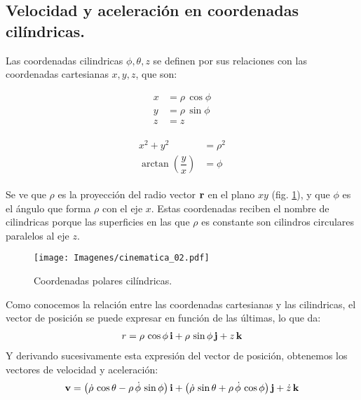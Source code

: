 \documentclass[12pt]{article}
\begin{document}
\subsection{Velocidad y aceleración en coordenadas cilíndricas.}

Las coordenadas cilindricas $\phi, \theta, z$ se definen por sus relaciones con las coordenadas cartesianas $x, y, z$, que son:

\vspace*{-1cm}
\begin{center}
\begin{minipage}[t]{0.3\linewidth}
\begin{align*}
x &= \rho \, \cos \phi \\
y &= \rho \, \sin \phi \\
z &= z
\end{align*}
\end{minipage}
\begin{minipage}[t]{0.3\linewidth}
\begin{align}
\begin{aligned}
x^{2} + y^{2} &= \rho^{2} \\
\arctan \left( \dfrac{y}{x} \right) &= \phi
\end{aligned}
\label{eq:ecuacion_02_10}
\end{align}
\end{minipage}
\end{center}
Se ve que $\rho$ es la proyección del radio vector $\vb{r}$ en el plano $x y$ (fig. \ref{fig:figura_02_02}), y que $\phi$ es el ángulo que forma $\rho$ con el eje $x$. Estas coordenadas reciben el nombre de cilindricas porque las superficies en las que $\rho$ es constante son cilindros circulares paralelos al eje $z$.
\begin{figure}[H]
    \centering
    \texttt{[image: Imagenes/cinematica\_02.pdf]}
    \caption{Coordenadas polares cilíndricas.}
    \label{fig:figura_02_02}    
\end{figure}
Como conocemos la relación entre las coordenadas cartesianas y las cilindricas, el vector de posición se puede expresar en función de las últimas, lo que da:
\begin{align}
r = \rho \, \cos \phi \, \vb{i} + \rho \, \sin \phi \, \vb{j} + z \, \vb{k}
\label{eq:ecuacion_02_11} 
\end{align}
Y derivando sucesivamente esta expresión del vector de posición, obtenemos los vectores de velocidad y aceleración:
\begin{align}
\vb{v} = \left( \dot{\rho} \, \cos \theta - \rho \, \dot{\phi} \, \sin \phi \right) \vb{i} + \left( \dot{\rho} \, \sin \theta + \rho \, \dot{\phi} \, \cos \phi \right) \vb{j} + \dot{z} \, \vb{k}
\label{eq:ecuacion_02_12}
\end{align}
\end{document}
